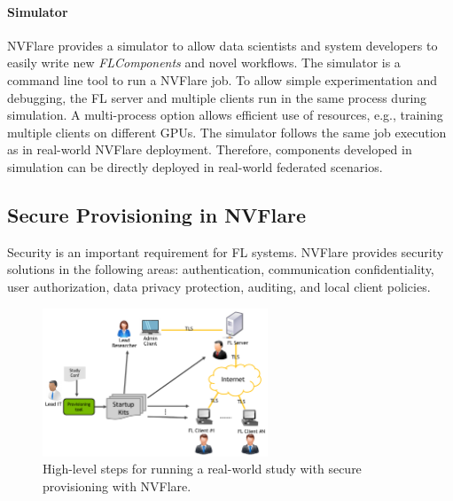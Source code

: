 \documentclass[11pt]{article}
\begin{document}
\paragraph{Simulator} NVFlare provides a simulator to allow data scientists and system developers to easily write new \textit{FLComponents} and novel workflows.
The simulator is a command line tool to run a NVFlare job. To allow simple experimentation and debugging, the FL server and multiple clients run in the same process during simulation. A multi-process option allows efficient use of resources, e.g., training multiple clients on different GPUs. The simulator follows the same job execution as in real-world NVFlare deployment. Therefore, components developed in simulation can be directly deployed in real-world federated scenarios.

\subsection{Secure Provisioning in NVFlare}
Security is an important requirement for FL systems. NVFlare provides security solutions in the following areas: authentication, communication confidentiality, user authorization, data privacy protection, auditing, and local client policies.
\begin{figure}[htbp]
    \centering
    \includegraphics[width=0.6\textwidth]{fig/provisioning.pdf}
    \caption{High-level steps for running a real-world study with secure provisioning with NVFlare. \label{fig:provisioning}}
\end{figure}
\end{document}
